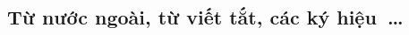 \documentclass[a4paper,oneside,14pt]{extbook} %
\newcommand{\note}[1]{\underline{#1}}
\begin{document}







\subsection{Từ nước ngoài, từ viết tắt, các ký hiệu~\ldots{}}
\end{document}
